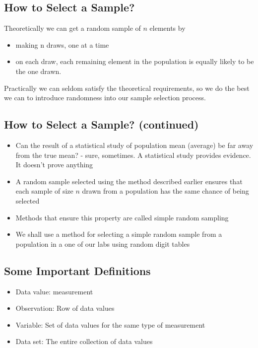 \documentclass[
  letterpaper,
  DIV=11,
  numbers=noendperiod]{scrartcl}
\begin{document}
\subsection{How to Select a Sample?}\label{how-to-select-a-sample}

Theoretically we can get a random sample of \(n\) elements by

\begin{itemize}
\item
  making n draws, one at a time
\item
  on each draw, each remaining element in the population is {equally
  likely} to be the one drawn.
\end{itemize}

Practically we can seldom satisfy the theoretical requirements, so we do
the best we can to introduce randomness into our sample selection
process.

\subsection{How to Select a Sample?
(continued)}\label{how-to-select-a-sample-continued}

\begin{itemize}
\item
  Can the result of a statistical study of population mean (average) be
  far away from the true mean? - sure, sometimes. A statistical study
  provides evidence. It doesn't prove anything\\
\item
  A random sample selected using the method described earlier ensures
  that each sample of size \(n\) drawn from a population has the same
  chance of being selected
\item
  Methods that ensure this property are called {simple random sampling}
\item
  We shall use a method for selecting a simple random sample from a
  population in a one of our labs using random digit tables
\end{itemize}

\subsection{Some Important
Definitions}\label{some-important-definitions}

\begin{itemize}
\item
  {Data value:} measurement
\item
  {Observation:} Row of data values
\item
  {Variable:} Set of data values for the same type of measurement
\item
  {Data set:} The entire collection of data values
\end{itemize}
\end{document}
